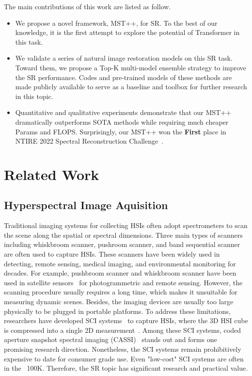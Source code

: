\documentclass[10pt,twocolumn,letterpaper]{article}
\begin{document}
The main contributions of this work are listed as follow.
\begin{itemize}
\item We propose a novel framework, MST++, for SR. To the best of our knowledge, it is the first attempt to explore the potential of Transformer in this task. 
\item We validate a series of natural image restoration models on this SR task. Toward them, we propose a Top-K multi-model ensemble strategy to improve the SR performance. Codes and pre-trained models of these methods are made publicly available to serve as a baseline and toolbox for further research in this topic.
\item Quantitative and qualitative experiments demonstrate that our MST++ dramatically outperforms SOTA methods while requiring much cheaper Params and FLOPS. Surprisingly, our MST++ won the \textbf{First} place in NTIRE 2022 Spectral Reconstruction Challenge~\cite{arad2022ntirerecovery}.
\end{itemize}

\section{Related Work}

\subsection{Hyperspectral Image Aquisition}
Traditional imaging systems for collecting HSIs often adopt spectrometers to scan the scene along the spatial or spectral dimensions. Three main types of scanners including whiskbroom scanner, pushroom scanner, and band sequential scanner are often used to capture HSIs. These scanners have been widely used in detecting, remote sensing, medical imaging, and environmental monitoring for decades.  For example, pushbroom scanner and whiskbroom scanner have been used in satellite sensors~\cite{satellite_1,satellite_2} for photogrammetric and remote sensing. However, the scanning procedure usually requires a long time, which makes it unsuitable for measuring dynamic scenes. Besides, the imaging devices are usually too large physically to be plugged in portable platforms. To address these limitations, researchers have developed SCI systems~\cite{sci_1,sci_2,sci_3,sci_5,sci_6} to capture HSIs, where the 3D HSI cube is compressed into a single 2D measurement~\cite{Yuan_review}. Among these SCI systems, coded aperture snapshot spectral imaging (CASSI)~\cite{tsa_net,sci_2} stands out and forms one promising research direction. Nonetheless, the SCI systems remain prohibitively expensive to date for consumer grade use. Even "low-cost" SCI systems are often in the \ 100K. Therefore, the SR topic has significant research and practical value. 
\end{document}
